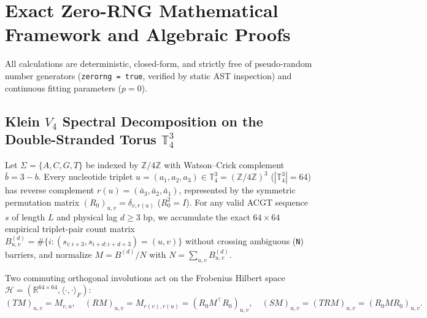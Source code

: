 \documentclass[11pt,a4paper]{article}
\renewcommand{\_}{\origunderscore\penalty200\relax}
\theoremstyle{remark}
\begin{document}
\section{Exact Zero-RNG Mathematical Framework and Algebraic Proofs}
All calculations are deterministic, closed-form, and strictly free of pseudo-random number generators (\texttt{zero\_rng = true}, verified by static AST inspection) and continuous fitting parameters ($p=0$).

\subsection{Klein \texorpdfstring{$V_4$}{V4} Spectral Decomposition on the Double-Stranded Torus \texorpdfstring{$\mathbb{T}_4^3$}{T4\textasciicircum 3}}
Let $\Sigma = \{A,C,G,T\}$ be indexed by $\mathbb{Z}/4\mathbb{Z}$ with Watson--Crick complement $\bar{b} = 3 - b$.
Every nucleotide triplet $u = (a_1,a_2,a_3) \in \mathbb{T}_4^3 = (\mathbb{Z}/4\mathbb{Z})^3$ ($|\mathbb{T}_4^3| = 64$) has reverse complement $r(u) = (\bar{a}_3, \bar{a}_2, \bar{a}_1)$, represented by the symmetric permutation matrix $(R_0)_{u,v} = \delta_{v, r(u)}$ ($R_0^2 = I$).
For any valid ACGT sequence $s$ of length $L$ and physical lag $d \ge 3\text{ bp}$, we accumulate the exact $64 \times 64$ empirical triplet-pair count matrix $B^{(d)}_{u,v} = \#\{i : (s_{i:i+3}, s_{i+d:i+d+3}) = (u,v)\}$ without crossing ambiguous (\texttt{N}) barriers, and normalize $M = B^{(d)} / N$ with $N = \sum_{u,v} B^{(d)}_{u,v}$.

Two commuting orthogonal involutions act on the Frobenius Hilbert space $\mathcal{H} = (\mathbb{R}^{64 \times 64}, \langle \cdot, \cdot \rangle_F)$:
\begin{equation}
(TM)_{u,v} = M_{v,u}, \quad (RM)_{u,v} = M_{r(v), r(u)} = (R_0 M^\top R_0)_{u,v}, \quad (SM)_{u,v} = (TRM)_{u,v} = (R_0 M R_0)_{u,v}.
\end{equation}
\end{document}
